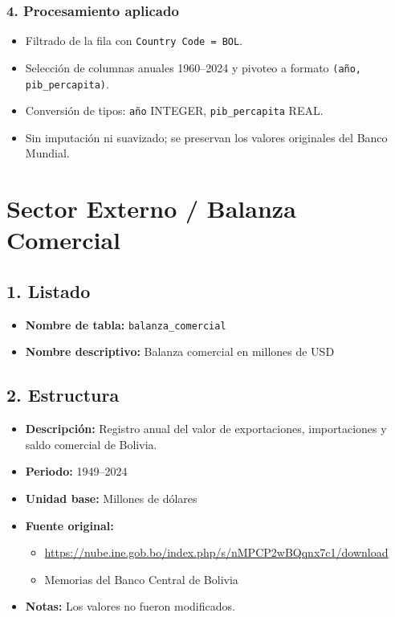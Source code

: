 \documentclass[12pt,a4paper]{article}
\begin{document}
\subsubsection*{4. Procesamiento aplicado}
\begin{itemize}
  \item Filtrado de la fila con \texttt{Country Code = BOL}.
  \item Selección de columnas anuales 1960--2024 y pivoteo a formato \texttt{(año, pib\_percapita)}.
  \item Conversión de tipos: \texttt{año} \textrightarrow{} INTEGER, \texttt{pib\_percapita} \textrightarrow{} REAL.
  \item Sin imputación ni suavizado; se preservan los valores originales del Banco Mundial.
\end{itemize}






\newpage
\section{Sector Externo / Balanza Comercial}

\subsection*{1. Listado}
\begin{itemize}
  \item \textbf{Nombre de tabla:} \texttt{balanza\_comercial}
  \item \textbf{Nombre descriptivo:} Balanza comercial en millones de USD
\end{itemize}

\subsection*{2. Estructura}
\begin{itemize}
  \item \textbf{Descripción:} Registro anual del valor de exportaciones, importaciones y saldo comercial de Bolivia.
  \item \textbf{Periodo:} 1949--2024
  \item \textbf{Unidad base:} Millones de dólares
  \item \textbf{Fuente original:}
    \begin{itemize}
      \item \url{https://nube.ine.gob.bo/index.php/s/nMPCP2wBQqnx7c1/download}
      \item Memorias del Banco Central de Bolivia
    \end{itemize}
  \item \textbf{Notas:} Los valores no fueron modificados.
\end{itemize}
\end{document}
